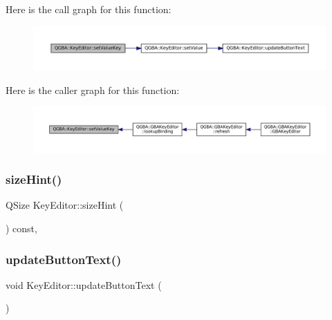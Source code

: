 Here is the call graph for this function\+:
\nopagebreak
\begin{figure}[H]
\begin{center}
\leavevmode
\includegraphics[width=350pt]{class_q_g_b_a_1_1_key_editor_a80ecd8bd41c6e71f8907391aeb1b2976_cgraph}
\end{center}
\end{figure}
Here is the caller graph for this function\+:
\nopagebreak
\begin{figure}[H]
\begin{center}
\leavevmode
\includegraphics[width=350pt]{class_q_g_b_a_1_1_key_editor_a80ecd8bd41c6e71f8907391aeb1b2976_icgraph}
\end{center}
\end{figure}
\mbox{\label{class_q_g_b_a_1_1_key_editor_aa762a31f045fb0982f5a897927b79814}} 
\subsubsection{\texorpdfstring{size\+Hint()}{sizeHint()}}
{\footnotesize\ttfamily Q\+Size Key\+Editor\+::size\+Hint (\begin{DoxyParamCaption}{ }\end{DoxyParamCaption}) const\hspace{0.3cm}{\ttfamily [override]}, {\ttfamily [virtual]}}

\mbox{\label{class_q_g_b_a_1_1_key_editor_a4c8a2961a38921ab2bbbf0bd3b763614}} 
\subsubsection{\texorpdfstring{update\+Button\+Text()}{updateButtonText()}}
{\footnotesize\ttfamily void Key\+Editor\+::update\+Button\+Text (\begin{DoxyParamCaption}{ }\end{DoxyParamCaption})\hspace{0.3cm}{\ttfamily [private]}}

